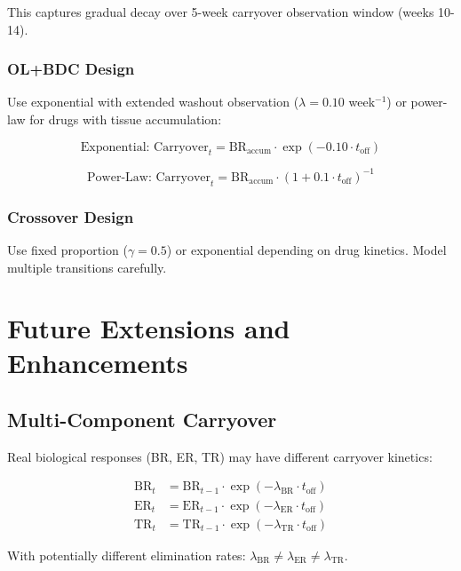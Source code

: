 \documentclass[11pt,a4paper]{article}
\begin{document}
This captures gradual decay over 5-week carryover observation window (weeks 10-14).

\subsubsection{OL+BDC Design}

Use exponential with extended washout observation ($\lambda = 0.10$ week$^{-1}$) or power-law for drugs with tissue accumulation:

\begin{equation}
  \text{Exponential: } \text{Carryover}_t = \text{BR}_{\text{accum}} \cdot \exp(-0.10 \cdot t_{\text{off}})
\end{equation}

\begin{equation}
  \text{Power-Law: } \text{Carryover}_t = \text{BR}_{\text{accum}} \cdot (1 + 0.1 \cdot t_{\text{off}})^{-1}
\end{equation}

\subsubsection{Crossover Design}

Use fixed proportion ($\gamma = 0.5$) or exponential depending on drug kinetics. Model multiple transitions carefully.

\section{Future Extensions and Enhancements}
\label{sec:future}

\subsection{Multi-Component Carryover}

Real biological responses (BR, ER, TR) may have different carryover kinetics:

\begin{align}
  \text{BR}_t &= \text{BR}_{t-1} \cdot \exp(-\lambda_{\text{BR}} \cdot t_{\text{off}}) \\
  \text{ER}_t &= \text{ER}_{t-1} \cdot \exp(-\lambda_{\text{ER}} \cdot t_{\text{off}}) \\
  \text{TR}_t &= \text{TR}_{t-1} \cdot \exp(-\lambda_{\text{TR}} \cdot t_{\text{off}})
\end{align}

With potentially different elimination rates: $\lambda_{\text{BR}} \neq \lambda_{\text{ER}} \neq \lambda_{\text{TR}}$.
\end{document}
